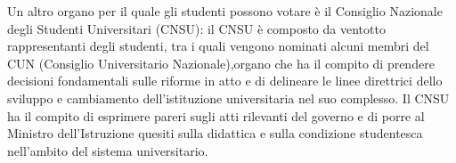 Un altro organo per il quale gli studenti possono votare è il Consiglio Nazionale degli Studenti Universitari (CNSU): il CNSU è composto da ventotto rappresentanti degli studenti, tra i quali vengono nominati alcuni membri del CUN (Consiglio Universitario Nazionale),organo che ha il compito di prendere decisioni fondamentali sulle riforme in atto e di delineare le linee direttrici dello sviluppo e cambiamento dell'istituzione universitaria nel suo complesso. Il CNSU ha il compito di esprimere pareri sugli atti rilevanti del governo e di porre al Ministro dell'Istruzione quesiti sulla didattica e  sulla condizione studentesca nell'ambito del sistema universitario. 
